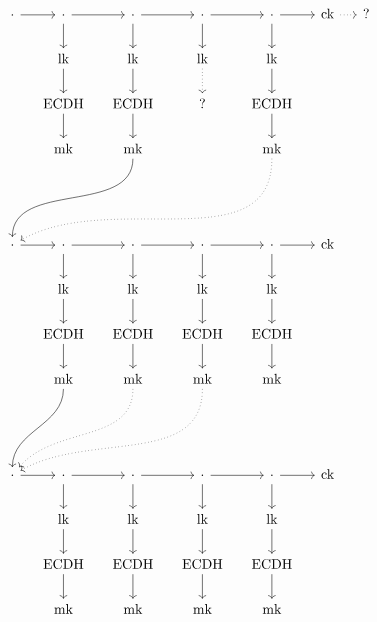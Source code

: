 \documentclass[letterpaper]{article}
\begin{document}



\def\ck{\textrm{ck}}
\def\DH{\textrm{DH}}
\def\lk{\textrm{lk}}
\def\mk{\textrm{mk}}
\def\ECDH{\textrm{ECDH}}
\def\name{\textrm{name}}

\[\begin{tikzcd}[ampersand replacement=\&, column sep=small]
\cdot \ar[r] \& \cdot \ar[r] \ar[d] \& \cdot \ar[r] \ar[d] \& \cdot \ar[r] \ar[d] \& \cdot \ar[r] \ar[d] \& \ck \ar[r, dotted] \& ? \& \\
 \& \lk \ar[d] \& \lk \ar[d] \& \lk \ar[d, dotted] \& \lk \ar[d] \&  \& \& \\ 
 \& \ECDH \ar[d] \& \ECDH \ar[d] \& ? \& \ECDH\ar[d] \&  \& \& \\
 \& \mk \& \mk \ar[dddll, in=90, out=270] \&  \& \mk \ar[dddllll, dotted, in=30, out=270] \&  \& \& \\
\\
\\
\cdot \ar[r] \& \cdot \ar[r] \ar[d] \& \cdot \ar[r] \ar[d] \& \cdot \ar[r] \ar[d] \& \cdot \ar[r] \ar[d] \& \ck \& \& \\
 \& \lk \ar[d] \& \lk \ar[d] \& \lk \ar[d] \& \lk \ar[d] \&  \& \& \\ 
 \& \ECDH \ar[d] \& \ECDH \ar[d] \& \ECDH \ar[d] \& \ECDH\ar[d] \&  \& \& \\
 \& \mk \ar[dddl, in=90, out=270] \& \mk \ar[dddll, dotted, in=50, out=270] \& \mk \ar[dddlll, dotted, in=30, out=270] \& \mk \&  \& \& \\
\\
\\
\cdot \ar[r] \& \cdot \ar[r] \ar[d] \& \cdot \ar[r] \ar[d] \& \cdot \ar[r] \ar[d] \& \cdot \ar[r] \ar[d] \& \ck \& \& \\
 \& \lk \ar[d] \& \lk \ar[d] \& \lk \ar[d] \& \lk \ar[d] \&  \& \& \\ 
 \& \ECDH \ar[d] \& \ECDH \ar[d] \& \ECDH \ar[d] \& \ECDH\ar[d] \&  \& \& \\
 \& \mk \& \mk \& \mk \& \mk \&  \& \& \\
\end{tikzcd}\]


\end{document}
